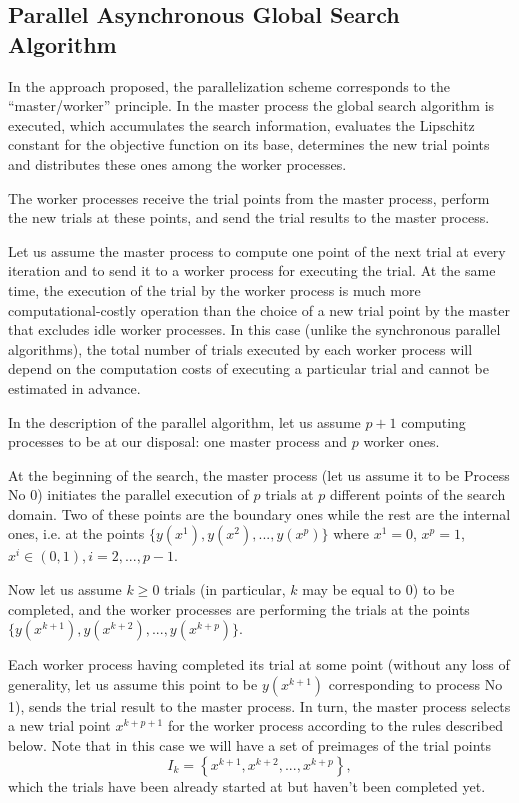 \documentclass{svproc}
\begin{document}
\subsection{Parallel Asynchronous Global Search Algorithm}

In the approach proposed, the parallelization scheme corresponds to the ``master/worker'' principle.
In the master process the global search algorithm is executed, which accumulates the search information, evaluates the Lipschitz constant for the objective function on its base, determines the new trial points and distributes these ones among the worker processes. 

The worker processes receive the trial points from the master process, perform the new trials at these points, and send the trial results to the master process. 

Let us assume the master process to compute one point of the next trial at every iteration and to send it to a worker process for executing the trial. 
At the same time, the execution of the trial by the worker process is much more computational-costly operation than the choice of a new trial point by the master that excludes idle worker processes. 
In this case (unlike the synchronous parallel algorithms), the total number of trials executed by each worker process will depend on the computation costs of executing a particular trial and cannot be estimated in advance.

In the description of the parallel algorithm, let us assume $p+1$ computing processes to be at our disposal: one master process and $p$ worker ones.
 
At the beginning of the search, the master process (let us assume it to be Process No 0) initiates the parallel execution of $p$ trials at $p$ different points of the search domain. 
Two of these points are the boundary ones while the rest are the internal ones, i.e. at the points $\{y(x^1), y(x^2), ...,y(x^p)\}$ where 
$x^1 = 0$, $x^p = 1$, $x^i\in(0,1), i=2,..., p-1$.

Now let us assume $k\geq 0$ trials (in particular, $k$ may be equal to 0) to be completed, and the worker processes are performing the trials at the points $\{y(x^{k+1}), y(x^{k+2}), ...,y(x^{k+p})\}$. 

Each worker process having completed its trial at some point (without any loss of generality, let us assume this point to be $y(x^{k+1})$ corresponding to process No 1), sends the trial result to the master process. 
In turn, the master process selects a new trial point $x^{k+p+1}$ for the worker process according to the rules described below.
Note that in this case we will have a set of preimages of the trial points
\[
I_k = \left\{ x^{k+1},x^{k+2},...,x^{k+p} \right\},
\]
which the trials have been already started at but haven't been completed yet.
\end{document}
